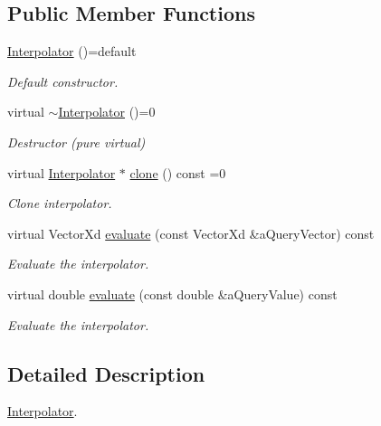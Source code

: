 \subsection*{Public Member Functions}
\begin{DoxyCompactItemize}
\item 
\hyperlink{classostk_1_1math_1_1curvefitting_1_1interp_1_1_interpolator_afcb021e5aa9972479e9e0750b86c6cd4}{Interpolator} ()=default
\begin{DoxyCompactList}\small\item\em Default constructor. \end{DoxyCompactList}\item 
virtual \hyperlink{classostk_1_1math_1_1curvefitting_1_1interp_1_1_interpolator_a6a6a80292cecb1353e1f7f5e8f147795}{$\sim$\+Interpolator} ()=0
\begin{DoxyCompactList}\small\item\em Destructor (pure virtual) \end{DoxyCompactList}\item 
virtual \hyperlink{classostk_1_1math_1_1curvefitting_1_1interp_1_1_interpolator}{Interpolator} $\ast$ \hyperlink{classostk_1_1math_1_1curvefitting_1_1interp_1_1_interpolator_a717dc5547d117cccd73506b75c40c66a}{clone} () const =0
\begin{DoxyCompactList}\small\item\em Clone interpolator. \end{DoxyCompactList}\item 
virtual Vector\+Xd \hyperlink{classostk_1_1math_1_1curvefitting_1_1interp_1_1_interpolator_aac2035e403234027b227479d1e1b544e}{evaluate} (const Vector\+Xd \&a\+Query\+Vector) const
\begin{DoxyCompactList}\small\item\em Evaluate the interpolator. \end{DoxyCompactList}\item 
virtual double \hyperlink{classostk_1_1math_1_1curvefitting_1_1interp_1_1_interpolator_af678ba11fe02754aeaa821bc101fcd87}{evaluate} (const double \&a\+Query\+Value) const
\begin{DoxyCompactList}\small\item\em Evaluate the interpolator. \end{DoxyCompactList}\end{DoxyCompactItemize}


\subsection{Detailed Description}
\hyperlink{classostk_1_1math_1_1curvefitting_1_1interp_1_1_interpolator}{Interpolator}. 

